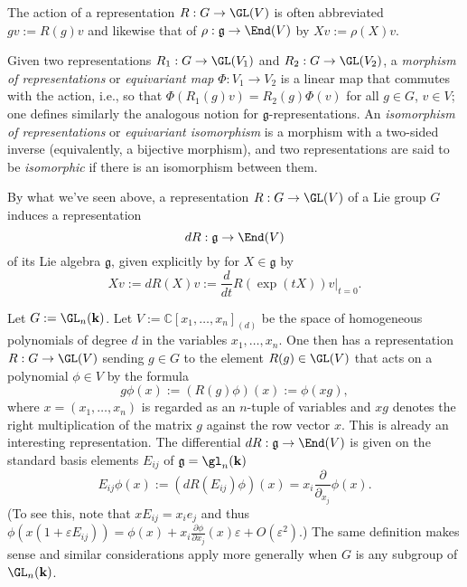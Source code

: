 \documentclass[reqno]{amsart} 
\def\eps{\varepsilon}
\begin{document}
\begin{definition}
  The action of a representation
  $R : G \rightarrow \GL(V)$
  is often abbreviated $g v := R(g) v$
  and likewise
  that of
  $\rho  : \mathfrak{g}  \rightarrow \End(V)$
  by $X v := \rho(X) v$.

  Given two representations
  $R_1 : G \rightarrow \GL(V_1)$
  and
  $R_2 : G \rightarrow \GL(V_2)$,
  a \emph{morphism of representations}
  or \emph{equivariant map}
  $\Phi : V_1 \rightarrow V_2$
  is a linear map that commutes
  with the action,
  i.e., so that
  $\Phi(R_1(g) v) = R_2(g) \Phi(v)$
  for all $g \in G$, $v \in V$;
  one defines similarly the analogous notion for
  $\mathfrak{g}$-representations.
  An \emph{isomorphism of representations}
  or \emph{equivariant isomorphism}
  is a morphism with a two-sided inverse
  (equivalently, a bijective morphism),
  and two representations are said to be \emph{isomorphic}
  if there is an isomorphism between them.
\end{definition}
By what we've seen above,
a representation $R : G \rightarrow \GL(V)$ of a Lie group $G$
induces a representation
\begin{equation*}
d R : \mathfrak{g} \rightarrow \End(V)
\end{equation*}
of its Lie algebra
$\mathfrak{g}$,
given explicitly by for $X \in \mathfrak{g}$ by
\begin{equation*}
X v := d R(X) v :=\frac{d}{ d t} R(\exp(t X)) v |_{t=0}.
\end{equation*}
\begin{example}\label{ex:polynomial-reps-linear-groups}
  Let $G := \GL_n(\mathbf{k})$.
  Let $V := \mathbb{C}[x_1,\dotsc,x_n]_{(d)}$ be the space of homogeneous polynomials
  of degree $d$ in the variables $x_1,\dotsc,x_n$.
  One then has a representation
  $R : G \rightarrow \GL(V)$
  sending $g \in G$
  to the element $R(g) \in \GL(V)$
  that acts on a polynomial $\phi \in V$
  by the formula
  \begin{equation*}
    g \phi(x) :=
    (R(g) \phi)(x) :=
    \phi(x g),
  \end{equation*}
  where $x = (x_1,\dotsc,x_n)$ is regarded as an $n$-tuple of
  variables
  and $x g$ denotes the right multiplication of the matrix $g$
  against
  the row vector $x$.
  This is already an interesting representation.
  The differential
  $d R : \mathfrak{g} \rightarrow \End(V)$
  is given on the standard basis elements $E_{i j}$ of $\mathfrak{g} = \gl_n(\mathbf{k})$
  \begin{equation*}
  E_{i j} \phi(x) := (d R(E_{i j}) \phi )(x)
  = x_i \frac{\partial }{\partial_{x_j}} \phi(x).
  \end{equation*}
  (To see this,
  note that
  $x E_{i j} = x_i e_j$
  and thus $\phi(x(1 + \eps E_{i j}))
  = \phi(x) + x_i \frac{\partial \phi}{\partial x_j}(x) \eps + O(\eps^2)$.)
  The same definition makes sense and similar
  considerations apply more generally when $G$ is any subgroup of
  $\GL_n(\mathbf{k})$.
\end{example}
\end{document}
